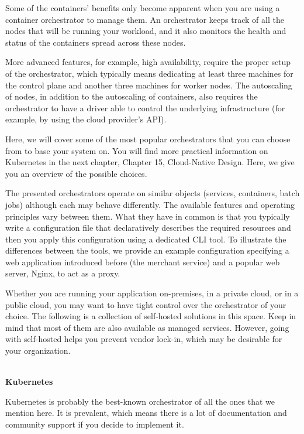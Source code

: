 
Some of the containers' benefits only become apparent when you are using a container orchestrator to manage them. An orchestrator keeps track of all the nodes that will be running your workload, and it also monitors the health and status of the containers spread across these nodes.

More advanced features, for example, high availability, require the proper setup of the orchestrator, which typically means dedicating at least three machines for the control plane and another three machines for worker nodes. The autoscaling of nodes, in addition to the autoscaling of containers, also requires the orchestrator to have a driver able to control the underlying infrastructure (for example, by using the cloud provider's API).

Here, we will cover some of the most popular orchestrators that you can choose from to base your system on. You will find more practical information on Kubernetes in the next chapter, Chapter 15, Cloud-Native Design. Here, we give you an overview of the possible choices.

The presented orchestrators operate on similar objects (services, containers, batch jobs) although each may behave differently. The available features and operating principles vary between them. What they have in common is that you typically write a configuration file that declaratively describes the required resources and then you apply this configuration using a dedicated CLI tool. To illustrate the differences between the tools, we provide an example configuration specifying a web application introduced before (the merchant service) and a popular web server, Nginx, to act as a proxy.


Whether you are running your application on-premises, in a private cloud, or in a public cloud, you may want to have tight control over the orchestrator of your choice. The following is a collection of self-hosted solutions in this space. Keep in mind that most of them are also available as managed services. However, going with self-hosted helps you prevent vendor lock-in, which may be desirable for your organization.

\hspace*{\fill} \\ %
\noindent
\textbf{Kubernetes}

Kubernetes is probably the best-known orchestrator of all the ones that we mention here. It is prevalent, which means there is a lot of documentation and community support if you decide to implement it.

